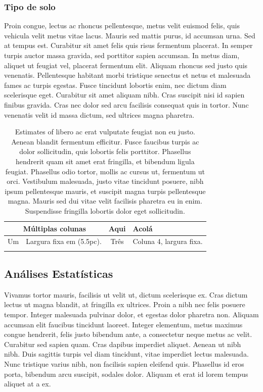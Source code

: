 \documentclass[book,A4paper,10pt,twoside,oldfontcommands]{memoir}\usepackage[]{graphicx}\usepackage[usenames,dvipsnames]{color}
\begin{document}
\begin{btUnit}
\subsubsection{Tipo de solo}

Proin congue, lectus ac rhoncus pellentesque, metus velit euismod
felis, quis vehicula velit metus vitae lacus. Mauris sed mattis purus,
id accumsan urna. Sed at tempus est. Curabitur sit amet felis quis
risus fermentum placerat. In semper turpis auctor massa gravida, sed
porttitor sapien accumsan. In metus diam, aliquet ut feugiat vel,
placerat fermentum elit. Aliquam rhoncus sed justo quis venenatis.
Pellentesque habitant morbi tristique senectus et netus et malesuada
fames ac turpis egestas. Fusce tincidunt lobortis enim, nec dictum
diam scelerisque eget. Curabitur sit amet aliquam nibh. Cras suscipit
nisi id sapien finibus gravida. Cras nec dolor sed arcu facilisis
consequat quis in tortor. Nunc venenatis velit id massa dictum, sed
ultrices magna pharetra.


\begin{table}
\centering
\caption{Estimates of libero ac erat vulputate feugiat non
  eu justo. Aenean blandit fermentum efficitur. Fusce faucibus turpis
  ac dolor sollicitudin, quis lobortis felis porttitor. Phasellus
  hendrerit quam sit amet erat fringilla, et bibendum ligula feugiat.
  Phasellus odio tortor, mollis ac cursus ut, fermentum ut orci.
  Vestibulum malesuada, justo vitae tincidunt posuere, nibh ipsum
  pellentesque mauris, et suscipit magna turpis pellentesque magna.
  Mauris sed dui vitae velit facilisis pharetra eu in enim.
  Suspendisse fringilla lobortis dolor eget sollicitudin.}
\begin{tabular}{ c p{5.5pc} c p{5.5pc} }
\hline
\multicolumn{2}{c}{Múltiplas colunas} & Aqui & Acolá \\
\hline
Um & \raggedright\arraybackslash Largura fixa em (5.5pc). & Três &
\raggedright\arraybackslash Coluna 4, largura fixa.\\
\hline
\label{Tab:estim}
\end{tabular}
\end{table}

\subsection{Análises Estatísticas}


Vivamus tortor mauris, facilisis ut velit ut, dictum scelerisque ex.
Cras dictum lectus ut magna blandit, at fringilla ex ultrices. Proin a
nibh nec felis posuere tempor. Integer malesuada pulvinar dolor, et
egestas dolor pharetra non. Aliquam accumsan elit faucibus tincidunt
laoreet. Integer elementum, metus maximus congue hendrerit, felis
justo bibendum ante, a consectetur neque metus ac velit. Curabitur sed
sapien quam. Cras dapibus imperdiet aliquet. Aenean ut nibh nibh. Duis
sagittis turpis vel diam tincidunt, vitae imperdiet lectus malesuada.
Nunc tristique varius nibh, non facilisis sapien eleifend quis.
Phasellus id eros porta, bibendum arcu suscipit, sodales dolor.
Aliquam et erat id lorem tempus aliquet at a ex.


\end{btUnit}
\end{document}
